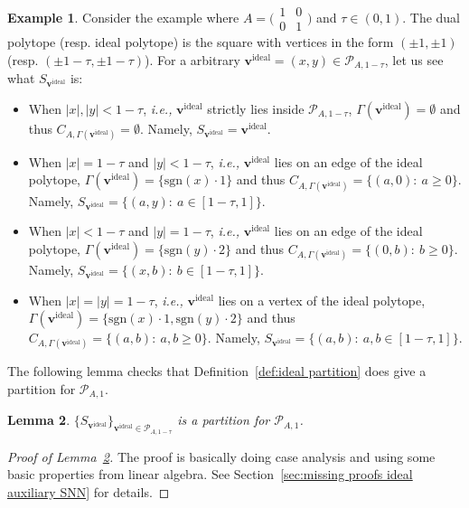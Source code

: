 \documentclass[11pt]{article}
\newtheorem{lemma}{Lemma}[section]
\theoremstyle{remark}
\theoremstyle{definition}
\newtheorem{exmp}[lemma]{Example}
\newcommand{\bv}{\mathbf{v}}
\begin{document}
\begin{exmp}
	Consider the example where $A=\bigl( \begin{smallmatrix}1&0\\0&1\end{smallmatrix}\bigr)$ and $\tau\in(0,1)$. The dual polytope (resp. ideal polytope) is the square with vertices in the form $(\pm1,\pm1)$ (resp. $(\pm1-\tau,\pm1-\tau)$). For a arbitrary $\bv^\text{ideal}=(x,y)\in\mathcal{P}_{A,1-\tau}$, let us see what $S_{\bv^\text{ideal}}$ is:
	\begin{itemize}
		\item When $|x|,|y|<1-\tau$, \textit{i.e.,} $\bv^\text{ideal}$ strictly lies inside $\mathcal{P}_{A,1-\tau}$, $\Gamma(\bv^\text{ideal})=\emptyset$ and thus $C_{A,\Gamma(\bv^\text{ideal})}=\emptyset$. Namely, $S_{\bv^\text{ideal}}=\bv^\text{ideal}$.
		\item When $|x|=1-\tau$ and $|y|<1-\tau$, \textit{i.e.,} $\bv^\text{ideal}$ lies on an edge of the ideal polytope, $\Gamma(\bv^\text{ideal})=\{\text{sgn}(x)\cdot1\}$ and thus $C_{A,\Gamma(\bv^\text{ideal})}=\{(a,0):\ a\geq0\}$. Namely, $S_{\bv^\text{ideal}}=\{(a,y):\ a\in[1-\tau,1] \}$.
		\item When $|x|<1-\tau$ and $|y|=1-\tau$, \textit{i.e.,} $\bv^\text{ideal}$ lies on an edge of the ideal polytope, $\Gamma(\bv^\text{ideal})=\{\text{sgn}(y)\cdot2\}$ and thus $C_{A,\Gamma(\bv^\text{ideal})}=\{(0,b):\ b\geq0\}$. Namely, $S_{\bv^\text{ideal}}=\{(x,b):\ b\in[1-\tau,1] \}$.
		\item When $|x|=|y|=1-\tau$, \textit{i.e.,} $\bv^\text{ideal}$ lies on a vertex of the ideal polytope, $\Gamma(\bv^\text{ideal})=\{\text{sgn}(x)\cdot1,\text{sgn}(y)\cdot2\}$ and thus $C_{A,\Gamma(\bv^\text{ideal})}=\{(a,b):\ a,b\geq0\}$. Namely, $S_{\bv^\text{ideal}}=\{(a,b):\ a,b\in[1-\tau,1] \}$.
	\end{itemize}
\end{exmp}

The following lemma checks that Definition~\ref{def:ideal partition} does give a partition for $\mathcal{P}_{A,1}$.
\begin{lemma}\label{lem:ideal partition}
	$\{S_{\bv^\text{ideal}}\}_{\bv^\text{ideal}\in\mathcal{P}_{A,1-\tau}}$ is a partition for $\mathcal{P}_{A,1}$.
\end{lemma}
\begin{proof}[Proof of Lemma~\ref{lem:ideal partition}]
	The proof is basically doing case analysis and using some basic properties from linear algebra. See Section~\ref{sec:missing proofs ideal auxiliary SNN} for details.
\end{proof}
\end{document}
